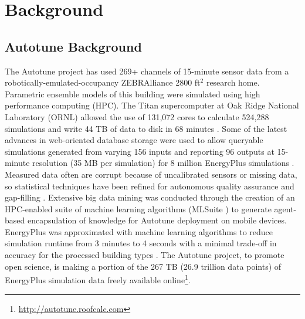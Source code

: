 \documentclass[preprint, review, 12pt]{elsarticle}
\begin{document}
\section{Background}
\label{sec:background}

\subsection{Autotune Background}
The Autotune project has used 269+ channels of 15-minute sensor data from a robotically-emulated-occupancy ZEBRAlliance \cite{cit:miller2012,cit:biswas2012} 2800 ft$^2$ research home. Parametric ensemble models of this building were simulated using high performance computing (HPC). The Titan supercomputer at Oak Ridge National Laboratory (ORNL) allowed the use of 131,072 cores to calculate 524,288 simulations and write 44 TB of data to disk in 68 minutes \cite{cit:sanyal2013a}. Some of the latest advances in web-oriented database storage were used to allow queryable simulations generated from varying 156 inputs and reporting 96 outputs at 15-minute resolution (35 MB per simulation) for 8 million EnergyPlus simulations \cite{cit:sanyal2013b}. Measured data often are corrupt because of  uncalibrated sensors or missing data, so statistical techniques have been refined for autonomous quality assurance and gap-filling \cite{cit:castello2012}. Extensive big data mining was conducted through the creation of an HPC-enabled suite of machine learning algorithms (MLSuite \cite{cit:edwards2013}) to generate agent-based encapsulation of knowledge for Autotune deployment on mobile devices. EnergyPlus was approximated with machine learning algorithms to reduce simulation runtime from 3 minutes to 4 seconds with a minimal trade-off in accuracy for the processed building types \cite{cit:edwards2013}. The Autotune project, to promote open science, is making a portion of the 267 TB (26.9 trillion data points) of EnergyPlus simulation data freely available online\footnote{\url{http://autotune.roofcalc.com}}.
\end{document}
